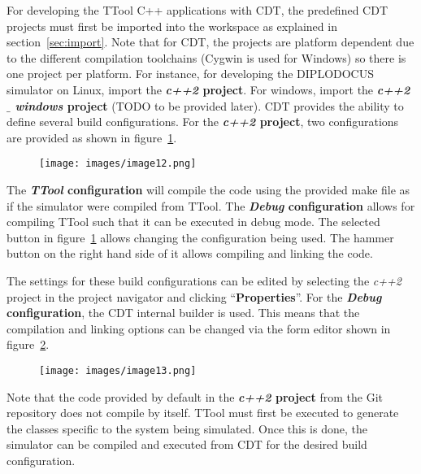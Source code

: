 \documentclass[12pt]{article}
\begin{document}
For developing the TTool C++ applications with CDT, the predefined CDT projects
must first be imported into the workspace as explained in
section~\ref{sec:import}. Note that for CDT, the projects are platform dependent
due to the different compilation toolchains (Cygwin is used for Windows) so there is one project per
platform. For instance, for developing the DIPLODOCUS simulator on Linux, import
the \textbf{\textit{c++2} project}. For windows, import the
\textbf{\textit{c++2 $  \_  $ windows} project} (TODO to be provided later). CDT
provides the ability to define several build configurations. For the
\textbf{\textit{c++2} project}, two configurations are provided as shown in
figure~\ref{fig:image11}.

\begin{figure}[H]
\begin{center}
\texttt{[image: images/image12.png]}
\end{center}
\caption{}
\label{fig:image11}
\end{figure}

The \textbf{\textit{TTool} configuration} will compile the code using the provided make
file as if the simulator were compiled from TTool. The \textbf{\textit{Debug}
configuration} allows for compiling TTool such that it can be executed in debug
mode. The selected button in figure~\ref{fig:image11} allows changing the configuration being
used. The hammer button on the right hand side of it allows compiling and
linking the code.

The settings for these build configurations can be edited by selecting the
\textit{c++2} project in the project navigator and clicking
``\textbf{Properties}''. For the \textbf{\textit{Debug} configuration}, the CDT internal builder
is used. This means that the compilation and linking options can be changed via
the form editor shown in figure~\ref{fig:image12}.

\begin{figure}[H]
\begin{center}
\texttt{[image: images/image13.png]}
\end{center}
\caption{}
\label{fig:image12}
\end{figure}

Note that the code provided by default in the \textbf{\textit{c++2} project}
from the Git repository does not compile by itself. TTool must first be executed
to generate the classes specific to the system being simulated. Once this is
done, the simulator can be compiled and executed from CDT for the desired build
configuration.
\end{document}
